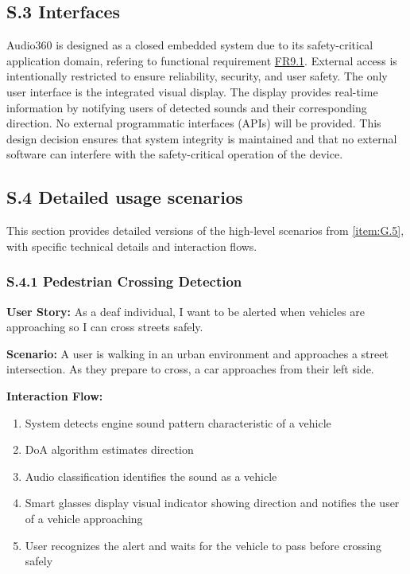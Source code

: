 \documentclass[12pt]{article}
\theoremstyle{definition}
\begin{document}
\subsection{S.3 Interfaces}
Audio360 is designed as a closed embedded system due to its safety-critical
application domain, refering to functional requirement \hyperref[FR9_1]{FR9.1}.
External access is intentionally restricted to ensure reliability, security,
and user safety.
The only user interface is the integrated visual display. The display provides
real-time information by notifying users of detected sounds and their
corresponding direction.
No external programmatic interfaces (APIs) will be provided. This design
decision ensures that system integrity is maintained and that no external
software can interfere with the safety-critical operation of the device.

\subsection{S.4 Detailed usage scenarios}

This section provides detailed versions of the high-level scenarios from \ref{item:G.5}, with specific technical details and interaction flows.

\subsubsection{S.4.1 Pedestrian Crossing Detection}
\textbf{User Story:} As a deaf individual, I want to be alerted when vehicles are approaching so I can cross streets safely.

\textbf{Scenario:} A user is walking in an urban environment and approaches a street intersection. As they prepare to cross, a car approaches from their left side.

\textbf{Interaction Flow:}
\begin{enumerate}
    \item System detects engine sound pattern characteristic of a vehicle
    \item DoA algorithm estimates direction
    \item Audio classification identifies the sound as a vehicle
    \item Smart glasses display visual indicator showing direction and notifies the user of a vehicle approaching
    \item User recognizes the alert and waits for the vehicle to pass before crossing safely
\end{enumerate}
\end{document}
